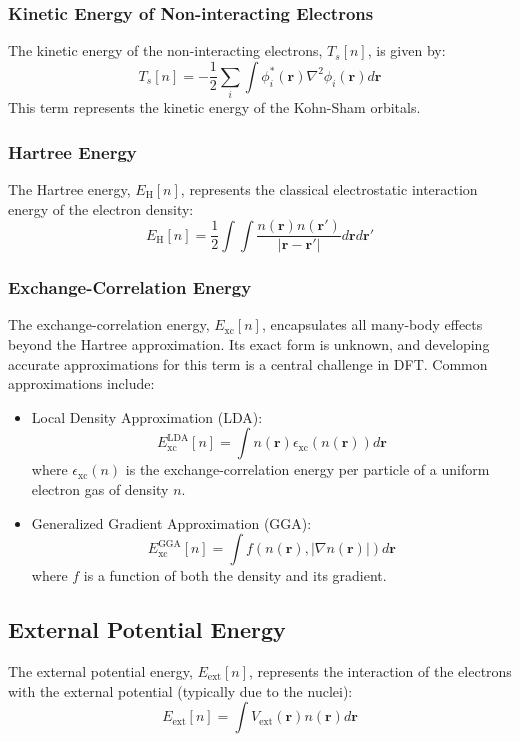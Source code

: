 \subsubsection{Kinetic Energy of Non-interacting Electrons}
The kinetic energy of the non-interacting electrons, $T_s[n]$, is given by:
\begin{equation}
T_s[n] = -\frac{1}{2}\sum_i \int \phi_i^*(\mathbf{r})\nabla^2\phi_i(\mathbf{r})d\mathbf{r}
\end{equation}
This term represents the kinetic energy of the Kohn-Sham orbitals.
\subsubsection{Hartree Energy}
The Hartree energy, $E_{\text{H}}[n]$, represents the classical electrostatic interaction energy of the electron density:
\begin{equation}
E_{\text{H}}[n] = \frac{1}{2}\int\int \frac{n(\mathbf{r})n(\mathbf{r'})}{|\mathbf{r}-\mathbf{r'}|}d\mathbf{r}d\mathbf{r'}
\end{equation}
\subsubsection{Exchange-Correlation Energy}
The exchange-correlation energy, $E_{\text{xc}}[n]$, encapsulates all many-body effects beyond the Hartree approximation. Its exact form is unknown, and developing accurate approximations for this term is a central challenge in DFT. Common approximations include:
\begin{itemize}
\item Local Density Approximation (LDA):
\begin{equation}
E_{\text{xc}}^{\text{LDA}}[n] = \int n(\mathbf{r})\epsilon_{\text{xc}}(n(\mathbf{r}))d\mathbf{r}
\end{equation}
where $\epsilon_{\text{xc}}(n)$ is the exchange-correlation energy per particle of a uniform electron gas of density $n$.
\item Generalized Gradient Approximation (GGA):
\begin{equation}
E_{\text{xc}}^{\text{GGA}}[n] = \int f(n(\mathbf{r}), |\nabla n(\mathbf{r})|)d\mathbf{r}
\end{equation}
where $f$ is a function of both the density and its gradient.
\end{itemize}
\subsection{External Potential Energy}
The external potential energy, $E_{\text{ext}}[n]$, represents the interaction of the electrons with the external potential (typically due to the nuclei):
\begin{equation}
E_{\text{ext}}[n] = \int V_{\text{ext}}(\mathbf{r})n(\mathbf{r})d\mathbf{r}
\end{equation}
